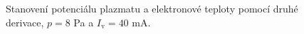 \documentclass[a4paper,12pt]{article}
\begin{document}
\begin{figure}[h!]
	\centering
	\begin{subfigure}[b]{.49\textwidth}
		\centering
	\end{subfigure}
	\begin{subfigure}[b]{.49\textwidth}
		\centering
	\end{subfigure}
	\caption{Stanovení potenciálu plazmatu a elektronové teploty pomocí druhé 
	derivace, $p = 8$ 
	\si{\pascal} a $I_\text{v} = 40$ \si{\milli\ampere}.}
	\label{data7sec}
\end{figure}
\end{document}
